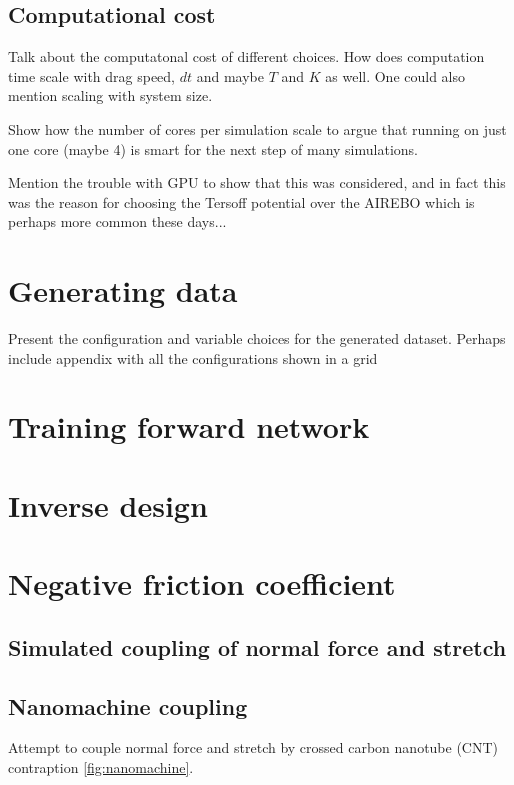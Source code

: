 \subsection{Computational cost}

Talk about the computatonal cost of different choices. How does computation time scale with drag speed, $dt$ and maybe $T$ and $K$ as well. One could also mention scaling with system size.

Show how the number of cores per simulation scale to argue that running on just one core (maybe 4) is smart for the next step of many simulations. 

Mention the trouble with GPU to show that this was considered, and in fact this was the reason for choosing the Tersoff potential over the AIREBO which is perhaps more common these days...



\section{Generating data}

Present the configuration and variable choices for the generated dataset. Perhaps include appendix with all the configurations shown in a grid


\section{Training forward network}

\section{Inverse design}

\section{Negative friction coefficient}
\subsection{Simulated coupling of normal force and stretch}
\subsection{Nanomachine coupling}
Attempt to couple normal force and stretch by crossed carbon nanotube (CNT) contraption \ref{fig:nanomachine}. 


